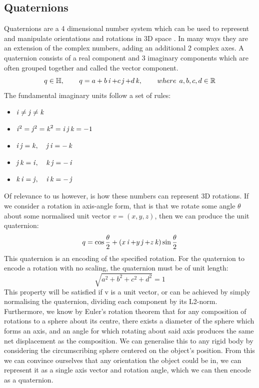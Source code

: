 \subsection{Quaternions}
\label{subsec:quaternions}
Quaternions are a 4 dimensional number system \cite{quaternions} which can be used to represent and manipulate orientations and rotations in 3D space \cite{orientations}. In many ways they are an extension of the complex numbers, adding an additional 2 complex axes. A quaternion consists of a real component and 3 imaginary components which are often grouped together and called the vector component.
$$q \in \operatorname{\mathbb{H}}, \operatorname{\operatorname{\: \: \: \:} \operatorname{\: \: \: \:}} q = a + b\operatorname{\mathit{i}} + c\operatorname{\mathit{j}} + d\operatorname{\mathit{k}}, \operatorname{\operatorname{\: \: \: \:} \operatorname{\: \: \: \:}} where \: \: a,b,c,d \in \operatorname{\mathbb{R}}$$
The fundamental imaginary units follow a set of rules:
\begin{itemize}
    \item $\operatorname{\mathit{i}} \neq \operatorname{\mathit{j}} \neq \operatorname{\mathit{k}}$
    \item $\operatorname{\mathit{i}}^2 = \operatorname{\mathit{j}}^2 = \operatorname{\mathit{k}}^2 = \operatorname{\mathit{i}}\operatorname{\mathit{j}}\operatorname{\mathit{k}} = -1$
    \item $\operatorname{\mathit{i}}\operatorname{\mathit{j}} = \operatorname{\mathit{k}}, \operatorname{\: \: \: \:} \operatorname{\mathit{j}}\operatorname{\mathit{i}} = -\operatorname{\mathit{k}}$
    \item $\operatorname{\mathit{j}}\operatorname{\mathit{k}} = \operatorname{\mathit{i}}, \operatorname{\: \: \: \:} \operatorname{\mathit{k}}\operatorname{\mathit{j}} = -\operatorname{\mathit{i}}$
    \item $\operatorname{\mathit{k}}\operatorname{\mathit{i}} = \operatorname{\mathit{j}}, \operatorname{\: \: \: \:} \operatorname{\mathit{i}}\operatorname{\mathit{k}} = -\operatorname{\mathit{j}}$
\end{itemize}
Of relevance to us however, is how these numbers can represent 3D rotations. If we consider a rotation in axis-angle form, that is that we rotate some angle $\theta$ about some normalised unit vector $v = (x,y,z)$, then we can produce the unit quaternion:
$$q = \cos{\frac{\theta}{2}} + (x\operatorname{\mathit{i}} + y\operatorname{\mathit{j}} + z\operatorname{\mathit{k}}) \sin{\frac{\theta}{2}}$$
This quaternion is an encoding of the specified rotation. For the quaternion to encode a rotation with no scaling, the quaternion must be of unit length:
$$\sqrt{a^2 + b^2 + c^2 + d^2} = 1$$
This property will be satisfied if v is a unit vector, or can be achieved by simply normalising the quaternion, dividing each component by its L2-norm.\\

Furthermore, we know by Euler's rotation theorem \cite{euler-theorem} that for any composition of rotations to a sphere about its centre, there exists a diameter of the sphere which forms an axis, and an angle for which rotating about said axis produces the same net displacement as the composition. We can generalise this to any rigid body by considering the circumscribing sphere centered on the object's position. From this we can convince ourselves that any orientation the object could be in, we can represent it as a single axis vector and rotation angle, which we can then encode as a quaternion.\\


